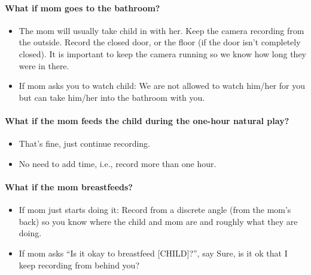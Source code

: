 \documentclass[
]{book}
\providecommand{\tightlist}{%
  \setlength{\itemsep}{0pt}\setlength{\parskip}{0pt}}
\begin{document}
\hypertarget{what-if-mom-goes-to-the-bathroom}{%
\paragraph*{What if mom goes to the bathroom?}\label{what-if-mom-goes-to-the-bathroom}}

\begin{itemize}
\tightlist
\item
  The mom will usually take child in with her. Keep the camera recording from the outside. Record the closed door, or the floor (if the door isn't completely closed). It is important to keep the camera running so we know how long they were in there.
\item
  If mom asks you to watch child: We are not allowed to watch him/her for you but can take him/her into the bathroom with you.
\end{itemize}

\hypertarget{what-if-the-mom-feeds-the-child-during-the-one-hour-natural-play}{%
\paragraph*{What if the mom feeds the child during the one-hour natural play?}\label{what-if-the-mom-feeds-the-child-during-the-one-hour-natural-play}}

\begin{itemize}
\tightlist
\item
  That's fine, just continue recording.
\item
  No need to add time, i.e., record more than one hour.
\end{itemize}

\hypertarget{what-if-the-mom-breastfeeds}{%
\paragraph*{What if the mom breastfeeds?}\label{what-if-the-mom-breastfeeds}}

\begin{itemize}
\tightlist
\item
  If mom just starts doing it: Record from a discrete angle (from the mom's back) so you know where the child and mom are and roughly what they are doing.
\item
  If mom asks ``Is it okay to breastfeed {[}CHILD{]}?'', say Sure, is it ok that I keep recording from behind you?
\end{itemize}
\end{document}
